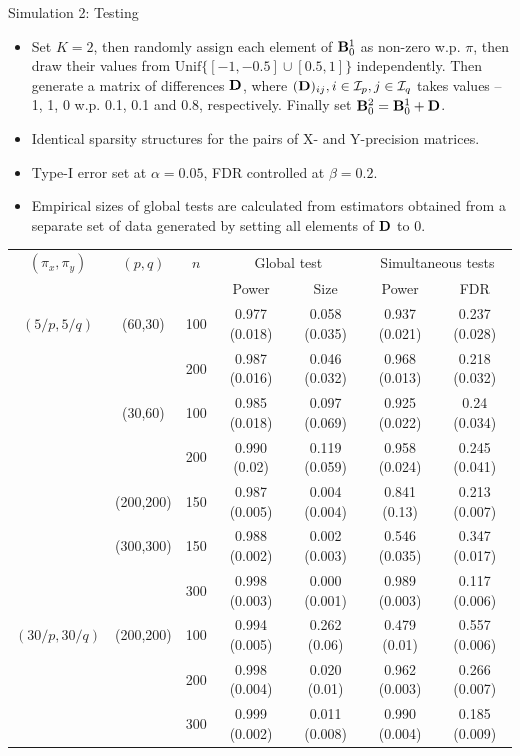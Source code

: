 \documentclass[landscape,a0paper,fontscale=0.4]{baposter} %
\newcommand{\compresslist}{ %
\setlength{\itemsep}{1pt}
\setlength{\parskip}{0pt}
\setlength{\parsep}{0pt}
}
\begin{document}
\begin{poster}
{{\large\colbbf Simulation 2: Testing}

\parbox{.39\textwidth}{
\begin{itemize}[leftmargin=*]\compresslist
\item Set $K=2$, then randomly assign each element of ${\mathbf{B}}_0^1$ as non-zero w.p. $\pi$, then draw their values from $\text{Unif}\{ [ -1, -0.5] \cup [0.5,1]\}$ independently. Then generate a matrix of differences ${\mathbf{D}}$, where $({\mathbf{D}})_{ij}, i \in {\cal{I}}_p, j \in {\cal{I}}_q$ takes values --1, 1, 0 w.p. 0.1, 0.1 and 0.8, respectively. Finally set ${\mathbf{B}}_0^2 = {\mathbf{B}}_0^1 + {\mathbf{D}}$.

\item Identical sparsity structures for the pairs of X- and Y-precision matrices.

\item Type-I error set at $\alpha=0.05$, FDR controlled at $\beta = 0.2$.

\item Empirical sizes of global tests are calculated from estimators obtained from a separate set of data generated by setting all elements of ${\mathbf{D}}$ to 0.
\end{itemize}
}
%
\parbox{.59\textwidth}{
\centering
\fontsize{9}{10}
\selectfont
\begin{tabular}{ccccccc}
\hline
$(\pi_x, \pi_y)$ & $(p,q)$   & $n$ & \multicolumn{2}{c}{Global test} & \multicolumn{2}{c}{Simultaneous tests}\\\cline{4-7}
 & & & Power     & Size			   & Power         & FDR           \\ \hline
    $(5/p, 5/q)$ & (60,30)   & 100 & 0.977 (0.018) & 0.058 (0.035) & 0.937 (0.021) & 0.237 (0.028) \\
    ~            & ~         & 200 & 0.987 (0.016) & 0.046 (0.032) & 0.968 (0.013) & 0.218 (0.032) \\
    ~            & (30,60)   & 100 & 0.985 (0.018) & 0.097 (0.069) & 0.925 (0.022) & 0.24 (0.034)  \\
    ~            & ~         & 200 & 0.990 (0.02)  & 0.119 (0.059) & 0.958 (0.024) & 0.245 (0.041) \\
    ~            & (200,200) & 150 & 0.987 (0.005) & 0.004 (0.004) & 0.841 (0.13)  & 0.213 (0.007) \\
    ~            & (300,300) & 150 & 0.988 (0.002) & 0.002 (0.003) & 0.546 (0.035) & 0.347 (0.017) \\
    ~            & ~         & 300 & 0.998 (0.003) & 0.000 (0.001) & 0.989 (0.003) & 0.117 (0.006) \\ \hline
  $(30/p, 30/q)$ & (200,200) & 100 & 0.994 (0.005) & 0.262 (0.06)  & 0.479 (0.01)  & 0.557 (0.006) \\
    ~            & ~         & 200 & 0.998 (0.004) & 0.020 (0.01)  & 0.962 (0.003) & 0.266 (0.007) \\
    ~            & ~         & 300 & 0.999 (0.002) & 0.011 (0.008) & 0.990 (0.004) & 0.185 (0.009) \\ \hline
\end{tabular}
}
}


\end{poster}
\end{document}

